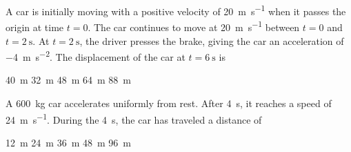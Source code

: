 \documentclass{../../../oss-ap12ibhl-print}
\begin{document}
\begin{questions}
  \question A car is initially moving with a positive velocity of
  \SI{20}{\metre\per\second} when it passes the origin at time $t=0$. The car
  continues to move at \SI{20}{\metre\per\second} between $t=0$ and
  $t=\SI{2}{\second}$. At $t=\SI{2}{\second}$, the driver presses the brake,
  giving the car an acceleration of \SI{-4}{\metre\per\second\squared}. The
  displacement of the car at $t=\SI{6}{\second}$ is
  \begin{choices}
    \choice\SI{40}{\metre}
    \choice\SI{32}{\metre}
    \choice\SI{48}{\metre}
    \choice\SI{64}{\metre}
    \choice\SI{88}{\metre}
  \end{choices}
  

  \question A \SI{600}{\kilo\gram} car accelerates uniformly from rest. After
  \SI{4}{\second}, it reaches a speed of \SI{24}{\metre\per\second}. During
  the \SI{4}{\second}, the car has traveled a distance of
  \begin{choices}
    \choice\SI{12}{\metre}
    \choice\SI{24}{\metre}
    \choice\SI{36}{\metre}
    \choice\SI{48}{\metre}
    \choice\SI{96}{\metre}
  \end{choices}



\end{questions}
\end{document}
